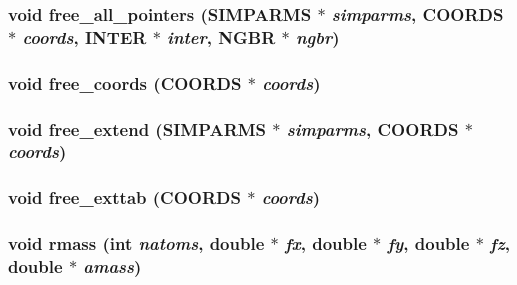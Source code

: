 \subsubsection{\setlength{\rightskip}{0pt plus 5cm}void free\_\-all\_\-pointers ({\bf SIMPARMS} $\ast$ {\em simparms}, {\bf COORDS} $\ast$ {\em coords}, {\bf INTER} $\ast$ {\em inter}, {\bf NGBR} $\ast$ {\em ngbr})}\label{md__util_8c_63964c6e98e40f123b60d2cf7a2bcdc9}


\subsubsection{\setlength{\rightskip}{0pt plus 5cm}void free\_\-coords ({\bf COORDS} $\ast$ {\em coords})}\label{md__util_8c_0ff8cae2318de2aa8baca8b88e6f6c71}


\subsubsection{\setlength{\rightskip}{0pt plus 5cm}void free\_\-extend ({\bf SIMPARMS} $\ast$ {\em simparms}, {\bf COORDS} $\ast$ {\em coords})}\label{md__util_8c_215290bdc1809b6e067daf4779d1012b}


\subsubsection{\setlength{\rightskip}{0pt plus 5cm}void free\_\-exttab ({\bf COORDS} $\ast$ {\em coords})}\label{md__util_8c_6ebb270f26e89f6ade540453c447ea3b}


\subsubsection{\setlength{\rightskip}{0pt plus 5cm}void rmass (int {\em natoms}, double $\ast$ {\em fx}, double $\ast$ {\em fy}, double $\ast$ {\em fz}, double $\ast$ {\em amass})}\label{md__util_8c_81f071e06b2705ae33a2addd6a66c15d}


